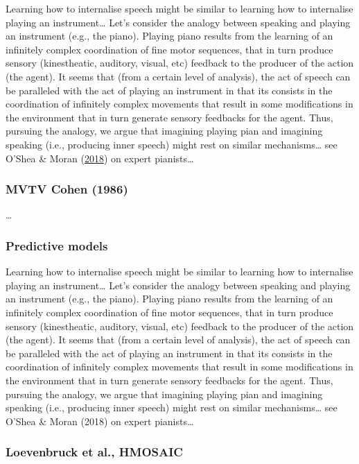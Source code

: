 \documentclass[a4paper,12pt,twoside,openright,oldfontcommands]{memoir}
\begin{document}
Learning how to internalise speech might be similar to learning how to
internalise playing an instrument\ldots{} Let's consider the analogy
between speaking and playing an instrument (e.g., the piano). Playing
piano results from the learning of an infinitely complex coordination of
fine motor sequences, that in turn produce sensory (kinestheatic,
auditory, visual, etc) feedback to the producer of the action (the
agent). It seems that (from a certain level of analysis), the act of
speech can be paralleled with the act of playing an instrument in that
its consists in the coordination of infinitely complex movements that
result in some modifications in the environment that in turn generate
sensory feedbacks for the agent. Thus, pursuing the analogy, we argue
that imagining playing pian and imagining speaking (i.e., producing
inner speech) might rest on similar mechanisms\ldots{} see O'Shea \&
Moran (\protect\hyperlink{ref-oshea_go_2018}{2018}) on expert
pianists\ldots{}

\subsubsection{MVTV Cohen (1986)}\label{mvtv-cohen-1986}

\ldots{}

\subsubsection{Predictive models}\label{predictive-models}

Learning how to internalise speech might be similar to learning how to
internalise playing an instrument\ldots{} Let's consider the analogy
between speaking and playing an instrument (e.g., the piano). Playing
piano results from the learning of an infinitely complex coordination of
fine motor sequences, that in turn produce sensory (kinestheatic,
auditory, visual, etc) feedback to the producer of the action (the
agent). It seems that (from a certain level of analysis), the act of
speech can be paralleled with the act of playing an instrument in that
its consists in the coordination of infinitely complex movements that
result in some modifications in the environment that in turn generate
sensory feedbacks for the agent. Thus, pursuing the analogy, we argue
that imagining playing pian and imagining speaking (i.e., producing
inner speech) might rest on similar mechanisms\ldots{} see O'Shea \&
Moran (2018) on expert pianists\ldots{}

\subsubsection{Loevenbruck et al.,
HMOSAIC}\label{loevenbruck-et-al.-hmosaic}
\end{document}
